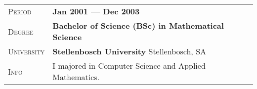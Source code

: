 \documentclass[a4paper, oneside, final]{scrartcl} %
\newcommand{\gray}{\rowcolor[gray]{.90}} %
\newcommand{\subSecHeadWidth}{2.1cm}
\begin{document}
\begin{center}
\begin{tabularx}{0.97\linewidth}{>{\raggedleft\scshape}p{\subSecHeadWidth}X}
\gray Period & \textbf{Jan 2001 --- Dec 2003}\\
\gray Degree & \textbf{Bachelor of Science (BSc) in Mathematical Science}\\
\gray University & \textbf{Stellenbosch University} \hfill Stellenbosch, SA\\
Info & I majored in Computer Science and Applied Mathematics.
\end{tabularx}



\end{center}
\end{document}
